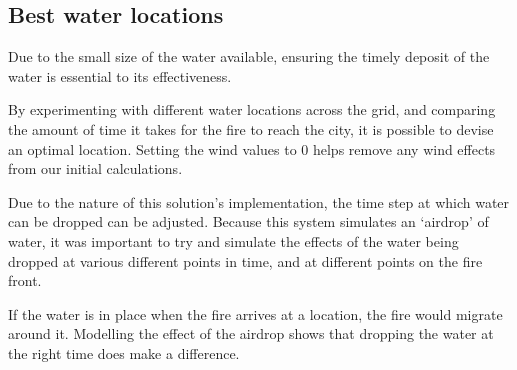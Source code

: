 \documentclass[11pt, a4paper, titlepage]{article}
\begin{document}
  \subsection{Best water locations}
  Due to the small size of the water available, ensuring the timely deposit of the water is essential to its effectiveness.

  By experimenting with different water locations across the grid, and comparing the amount of time it takes for the fire to reach the city, it is possible to devise an optimal location. Setting the wind values to 0 helps remove any wind effects from our initial calculations.

  Due to the nature of this solution's implementation, the time step at which water can be dropped can be adjusted. Because this system simulates an `airdrop' of water, it was important to try and simulate the effects of the water being dropped at various different points in time, and at different points on the fire front.

  If the water is in place when the fire arrives at a location, the fire would migrate around it. Modelling the effect of the airdrop shows that dropping the water at the right time does make a difference.
\end{document}

